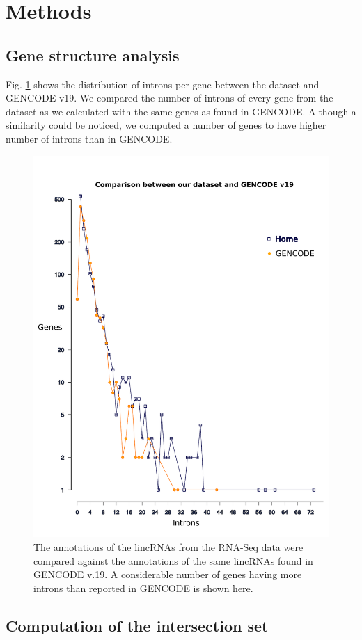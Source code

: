 \documentclass[ncrna,article,submit,moreauthors,pdftex,10pt,a4paper]{mdpi}
\begin{document}
\section{Methods}
\subsection{Gene structure analysis}

Fig. \ref{comparison} shows the distribution of introns per gene between the dataset and GENCODE v19. We compared the number of introns of every gene from the dataset as we calculated with the same genes as found in GENCODE. Although a similarity could be noticed, we computed a number of genes to have higher number of introns than in GENCODE.
\begin{figure}[H]
 \centering
 \includegraphics[height = 12 cm, width=14 cm]{comparison_plot_2}
 \caption{The annotations of the lincRNAs from the RNA-Seq data were compared against the annotations of the same lincRNAs found in GENCODE v.19. A considerable number of genes having more introns than reported in GENCODE is shown here.}
 \label{comparison}
\end{figure}

\subsection{Computation of the intersection set}
\end{document}

